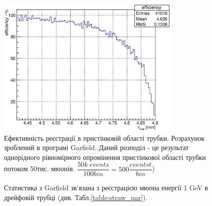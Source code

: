 \documentclass[pdftex,14pt]{scrartcl}
\begin{document}
\begin{spacing}{1.5}
	\begin{figure}[h!]
	\centering
	\includegraphics[width=0.8\textwidth]{periffEff}
	\caption{ Ефективність реєстрації в пристінковій області трубки. Розрахунок зроблений в програмі Garfield. Даний розподіл - це результат однорідного рівномірного опромінення пристінкової області трубки потоком 50тис. мюонів. $\dfrac{50k~events}{100 bin}  = 500 \dfrac{eventst}{bin}$)}
	\label{fig:efficiency}
	\end{figure}	
	
	\begin{figure}[h!]
		\centering
		\qquad
			\caption{ Статистика з Garfield зв’язана з реєстрацією мюона енергії 1 GeV в дрейфовій трубці (див. Табл.\ref{table:straw_par}).}
	\end{figure}
	

\end{spacing}
\end{document}
